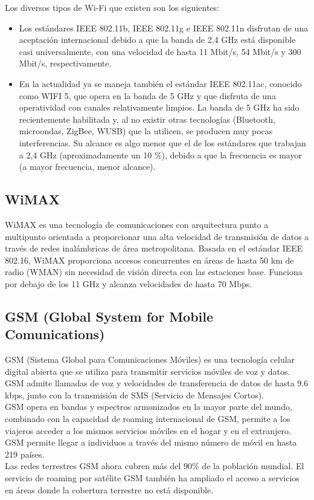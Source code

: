 		Los diversos tipos de Wi-Fi que existen  son los siguientes:
		\begin{itemize}
			\item Los estándares IEEE 802.11b, IEEE 802.11g e IEEE 802.11n disfrutan de una aceptación internacional debido a que la banda de 2,4 GHz está disponible casi universalmente, con una velocidad de hasta 11 Mbit/s, 54 Mbit/s y 300 Mbit/s, respectivamente.
			\item En la actualidad ya se maneja también el estándar IEEE 802.11ac, conocido como WIFI 5, que opera en la banda de 5 GHz y que disfruta de una operatividad con canales relativamente limpios. La banda de 5 GHz ha sido recientemente habilitada y, al no existir otras tecnologías (Bluetooth, microondas, ZigBee, WUSB) que la utilicen, se producen muy pocas interferencias. Su alcance es algo menor que el de los estándares que trabajan a 2,4 GHz (aproximadamente un 10 \%), debido a que la frecuencia es mayor (a mayor frecuencia, menor alcance).
		\end{itemize}
	
		
		\subsection{WiMAX}
		WiMAX es una tecnología de comunicaciones con arquitectura punto a multipunto orientada a proporcionar una alta velocidad de transmisión de datos a través de redes inalámbricas de área metropolitana.  Basada en el estándar IEEE 802.16, WiMAX proporciona accesos concurrentes en áreas de hasta 50 km de radio (WMAN) sin necesidad de visión directa con las estaciones base. Funciona por debajo de los 11 GHz y alcanza velocidades de hasta 70 Mbps. \cite{camargo2009} \cite{salazarRedes}
		
		
		\subsection{GSM (Global System for Mobile Comunications)}
		GSM (Sistema Global para Comunicaciones Móviles) es una tecnología celular digital abierta que se utiliza para transmitir servicios móviles de voz y datos. GSM admite llamadas de voz y velocidades de transferencia de datos de hasta 9.6 kbps, junto con la transmisión de SMS (Servicio de Mensajes Cortos). \\
	
		GSM opera en bandas y espectros armonizados en la mayor parte del mundo, combinado con la capacidad de roaming internacional de GSM, permite a los viajeros acceder a los mismos servicios móviles en el hogar y en el extranjero. GSM permite llegar a individuos a través del mismo número de móvil en hasta 219 países. \\
	
		Las redes terrestres GSM ahora cubren más del 90\% de la población mundial. El servicio de roaming por satélite GSM también ha ampliado el acceso a servicios en áreas donde la cobertura terrestre no está disponible. \cite{gsm}
	
		